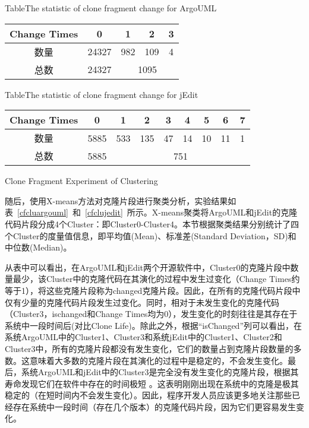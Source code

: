 \begin{table}[htbp]
{Table$\!$}{The statistic of clone fragment change for ArgoUML}
\vspace{0.5em}
\centering
\wuhao
\begin{tabular}{ccccc}
\toprule[1.5pt]
Change Times&0&1&2&3\\ 
\midrule[1pt]
数量&24327&982&109&4\\ 
\cline{3-5}
总数&24327&\multicolumn{3}{c}{1095} \\
\bottomrule[1.5pt]
\end{tabular}
\end{table}

\begin{table}[htbp]
{Table$\!$}{The statistic of clone fragment change for jEdit}
\vspace{0.5em}
\centering
\wuhao
\begin{tabular}{ccccccccc}
\toprule[1.5pt]
Change Times &0&1&2&3&4&5&6&7\\ 
\midrule[1pt]
数量&5885&533&135&47&14&10&11&1\\ 
\cline{3-9}
总数&5885&\multicolumn{7}{c}{751}   \\ 
\bottomrule[1.5pt]
\end{tabular}
\end{table}

{Clone Fragment Experiment of Clustering}

随后，使用X-means方法对克隆片段进行聚类分析，实验结果如表~\ref{cfcluargouml}~和~\ref{cfclujedit}~所示。X-means聚类将ArgoUML和jEdit的克隆代码片段分成4个Cluster：即Cluster0-Cluster4。本节根据聚类结果分别统计了四个Cluster的度量值信息，即平均值(Mean)、标准差(Standard Deviation，SD)和中位数(Median)。

从表中可以看出，在ArgoUML和jEdit两个开源软件中，Cluster0的克隆片段中数量最少，该Cluster中的克隆代码在其演化的过程中发生过变化（Change Times约等于1），将这些克隆片段称为changed克隆片段。因此，在所有的克隆代码片段中仅有少量的克隆代码片段发生过变化。同时，相对于未发生变化的克隆代码（Cluster3，ischanged和Change Times均为0），发生变化的时刻往往是其存在于系统中一段时间后(对比Clone Life)。除此之外，根据“isChanged”列可以看出，在系统ArgoUML中的Cluster1、Cluster3和系统jEdit中的Cluster1、Cluster2和Cluster3中，所有的克隆片段都没有发生变化，它们的数量占到克隆片段数量的多数。这意味着大多数的克隆片段在其演化的过程中是稳定的，不会发生变化。最后，系统ArgoUML和jEdit中的Cluster3是完全没有发生变化的克隆片段，根据其寿命发现它们在软件中存在的时间极短 。这表明刚刚出现在系统中的克隆是极其稳定的（在短时间内不会发生变化）。因此，程序开发人员应该更多地关注那些已经存在系统中一段时间（存在几个版本）的克隆代码片段，因为它们更容易发生变化。


